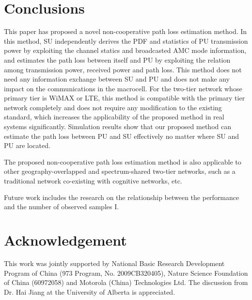 \documentclass[conference]{IEEEtran}
\begin{document}
\section{Conclusions}
This paper has proposed a novel non-cooperative path loss estimation
method. In this method, SU independently derives the PDF and
statistics of PU transmission power by exploiting the channel
statics and broadcasted AMC mode information, and estimates the path
loss between itself and PU by exploiting the relation among
transmission power, received power and path loss. This method does
not need any information exchange between SU and PU and does not
make any impact on the communications in the macrocell. For the
two-tier network whose primary tier is WiMAX or LTE, this method is
compatible with the primary tier network completely and does not
require any modification to the existing standard, which increases
the applicability of the proposed method in real systems
significantly. Simulation results show that our proposed method can
estimate the path loss between PU and SU effectively no matter where
SU and PU are located.

The proposed non-cooperative path loss estimation method is also
applicable to other geography-overlapped and spectrum-shared
two-tier networks, such as a traditional network co-existing with
cognitive networks, etc.

Future work includes the research on the relationship between the
performance and the number of observed samples I.


\section*{Acknowledgement}
This work was jointly supported by National Basic Research
Development Program of China (973 Program, No. 2009CB320405), Nature
Science Foundation of China (60972058) and Motorola (China)
Technologies Ltd. The discussion from Dr. Hai Jiang at the
University of Alberta is appreciated.
\end{document}
